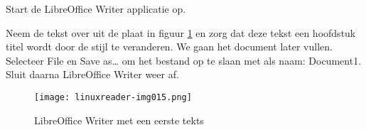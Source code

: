Start de LibreOffice Writer applicatie op.

Neem de tekst over uit de plaat in figuur \ref{fig:LOWriter_tekst} en zorg dat deze tekst een hoofdstuk titel wordt door de stijl te
veranderen. We gaan het document later vullen. Selecteer File en Save as{\dots} om het bestand op te slaan met als naam:
Document1. Sluit daarna LibreOffice Writer weer af.

\begin{figure}[H]
\texttt{[image: linuxreader-img015.png]}
	\caption{LibreOffice Writer met een eerste tekts}
	\label{fig:LOWriter_tekst}
\end{figure}
